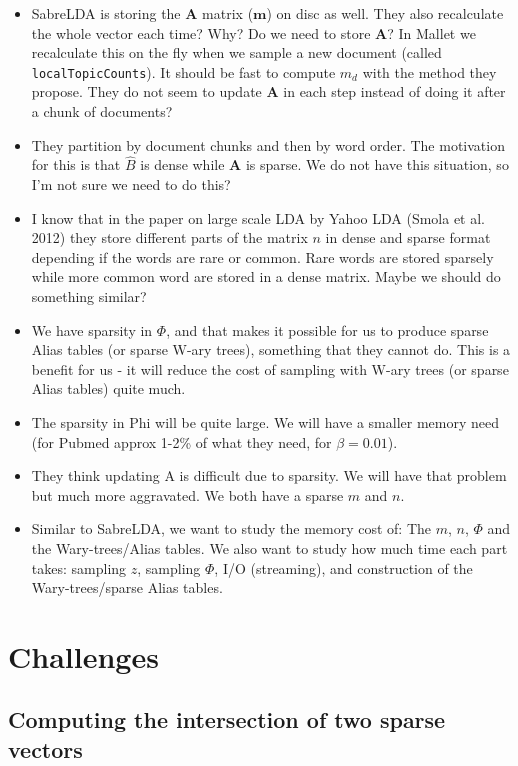 \documentclass{article}
\begin{document}
\begin{itemize}
  \item SabreLDA is storing the $\mathbf{A}$ matrix ($\mathbf{m}$) on disc as well. They also recalculate the whole vector each time? Why? Do we need to store $\mathbf{A}$? In Mallet we recalculate this on the fly when we sample a new document (called \texttt{localTopicCounts}). It should be fast to compute $m_d$ with the method they propose. They do not seem to update $\mathbf{A}$ in each step instead of doing it after a chunk of documents?
  \item They partition by document chunks and then by word order. The motivation for this is that $\hat{B}$ is dense while $\mathbf{A}$ is sparse. We do not have this situation, so I'm not sure we need to do this?
  \item I know that in the paper on large scale LDA by Yahoo LDA (Smola et al. 2012) they store different parts of the matrix $n$ in dense and sparse format depending if the words are rare or common. Rare words are stored sparsely while more common word are stored in a dense matrix. Maybe we should do something similar?
  \item We have sparsity in $\Phi$, and that makes it possible for us to produce sparse Alias tables (or sparse W-ary trees), something that they cannot do. This is a benefit for us - it will reduce the cost of sampling with W-ary trees (or sparse Alias tables) quite much.
  \item The sparsity in Phi will be quite large. We will have a smaller memory need (for Pubmed approx 1-2\% of what they need, for $\beta = 0.01$).
  \item They think updating A is difficult due to sparsity. We will have that problem but much more aggravated. We both have a sparse $m$ and $n$. 
  \item Similar to SabreLDA, we want to study the memory cost of: The $m$, $n$, $\Phi$ and the Wary-trees/Alias tables. We also want to study how much time each part takes: sampling $z$, sampling $\Phi$, I/O (streaming), and construction of the Wary-trees/sparse Alias tables.
\end{itemize}


\section{Challenges}

\subsection{Computing the intersection of two sparse vectors}
\end{document}

